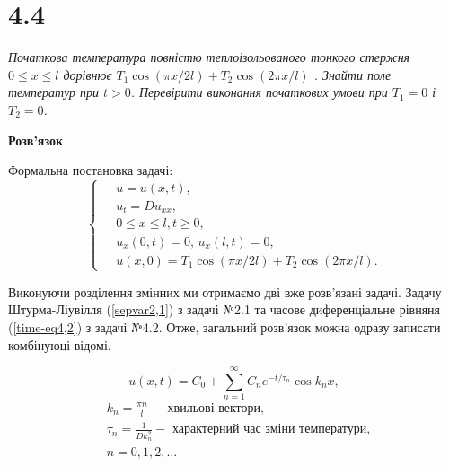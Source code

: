 

%


\section[Задача №4.4]{4.4}

\textit{Початкова температура повністю теплоізольованого тонкого стержня\\ $0 \leq x \leq l$ дорівнює $T_1 \cos(\pi x/2l) + T_2 \cos(2\pi x/l)$ . Знайти поле температур при $t > 0$. Перевірити виконання початкових умови при $T_1 = 0$ і $T_2 = 0$.}

\begin{center}
    \large{\textbf{Розв'язок}}
\end{center}

\noindent Формальна постановка задачі:
\begin{equation} \label{cond4,4}
    \left\{ \begin{aligned} %
            \;&u = u(x,t), \\
            &u_t = D u_{xx}, \\
            &0 \leq x \leq l, t \geq 0, \\
            &u_x(0,t) = 0, \, u_x(l,t) = 0,\\ 
            &u(x,0) = T_1 \cos(\pi x/2l) + T_2 \cos(2\pi x/l).
    \end{aligned} \right.
\end{equation}

Виконуючи розділення змінних ми отримаємо дві вже розв'язані задачі. Задачу Штурма-Ліувілля (\ref{sepvar2,1}) з задачі №2.1 та часове диференціальне рівняня (\ref{time-eq4,2}) з задачі №4.2. Отже, загальний розв'язок можна одразу записати комбінуюці відомі.

\begin{equation} \label{gensol4,4}
    u(x,t) = C_0 + \sum_{n=1}^{\infty}C_n e^{-t/\tau_n} \cos k_n x,
\end{equation}
\begin{equation*}
    \begin{aligned}
        &k_n = \frac{\pi n}{l} - \text{ хвильові вектори}, \\
        &\tau_n = \frac{1}{D k_n^2} - \text{ характерний час зміни температури}, \\
        &n = 0, 1, 2,\ldots
    \end{aligned}
\end{equation*}

